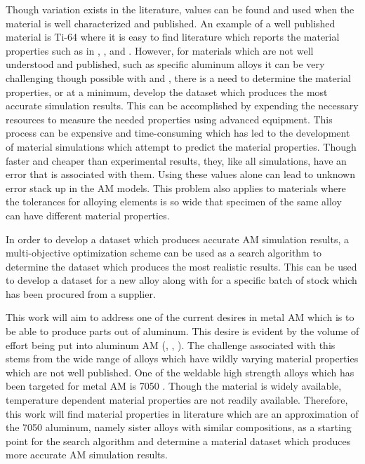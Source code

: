 \documentclass[pdflatex,sn-mathphys]{sn-jnl}
\begin{document}
	Though variation exists in the literature, values can be found and used when the material is well characterized and published.  An example of a well published material is Ti-64 where it is easy to find literature which reports the material properties such as in \cite{welschgerhard_1993}, \cite{boivineau_2006}, and  \cite{fan_2012}.  However, for materials which are not well understood and published, such as specific aluminum alloys it can be very challenging though possible with \cite{lundberg_material_1994} and \cite{leitner_thermophysical_2017}, there is a need to determine the material properties, or at a minimum, develop the dataset which produces the most accurate simulation results. 
	This can be accomplished by expending the necessary resources to measure the needed properties using advanced equipment.
	This process can be expensive and time-consuming which has led to the development of material simulations which attempt to predict the material properties.  Though faster and cheaper than experimental results, they, like all simulations, have an error that is associated with them.  Using these values alone can lead to unknown error stack up in the \ac{AM} models.
	This problem also applies to materials where the tolerances for alloying elements is so wide that specimen of the same alloy can have different material properties.  

	In order to develop a dataset which produces accurate \ac{AM} simulation results, a multi-objective optimization scheme can be used as a search algorithm to determine the dataset which produces the most realistic results.  This can be used to develop a dataset for a new alloy along with for a specific batch of stock which has been procured from a supplier. 

	This work will aim to address one of the current desires in metal \ac{AM} which is to be able to produce parts out of aluminum.  This desire is evident by the volume of effort being put into aluminum \ac{AM} (\cite{qiHighStrengthLi2020}, \cite{weissImprovedHighTemperatureAluminum2019}, \cite{weissDevelopmentsAluminumScandiumCeramicAluminumScandiumCerium2019}).  The challenge associated with this stems from the wide range of alloys which have wildly varying material properties which are not well published.  One of the weldable high strength alloys which has been targeted for metal \ac{AM} is 7050 \cite{singhAdditiveManufacturing4047}.  Though the material is widely available, temperature dependent material properties are not readily available.  Therefore, this work will find material properties in literature which are an approximation of the 7050 aluminum, namely sister alloys with similar compositions, as a starting point for the search algorithm and determine a material dataset which produces more accurate \ac{AM} simulation results. 
\end{document}
